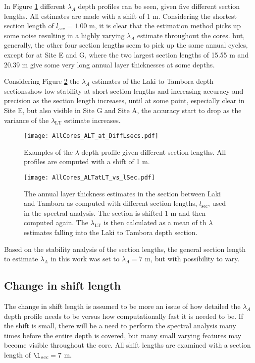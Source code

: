 \documentclass[../../CompleteThesis2/Complete_2ndDraft]{subfiles}
\begin{document}
In Figure \ref{Fig:AllCores_ALT_at_DiffLsecs} different $\lambda_A$ depth profiles can be seen, given five different section lengths. All estimates are made with a shift of 1 m. Considering the shortest section length of $l_{sec}=1.00$ m, it is clear that the estimation method picks up some noise resulting in a highly varying $\lambda_A$ estimate throughout the cores. but, generally, the other four section lengths seem to pick up the same annual cycles, except for at Site E and G, where the two largest section lengths of 15.55 m and 20.39 m give some very long annual layer thicknesses at some depths.

Considering Figure \ref{Fig:AllCores_ALTatLT_vs_lSec} the $\lambda_A$ estimates  of the Laki to Tambora depth sectionsshow low stability at short section lengths and increasing accuracy and precision as the section length increases, until at some point, especially clear in Site E, but also visible in Site G and Site A, the accuracy start to drop as the variance of the $\lambda_{\text{LT}}$ estimate increases.
\begin{figure}[h]
	\centering
	\texttt{[image: AllCores\_ALT\_at\_DiffLsecs.pdf]}
	\caption[$\lambda$ depth profiles, Different $l_{\text{sec}}$]{\small Examples of the $\lambda$ depth profile given different section lengths. All profiles are computed with a shift of 1 m.}
	\label{Fig:AllCores_ALT_at_DiffLsecs}
\end{figure}

\begin{figure}[h]
	\centering
	\texttt{[image: AllCores\_ALTatLT\_vs\_lSec.pdf]}
	\caption[$\lambda_{\text{LT}}$ vs. section length]{\small The annual layer thickness estimates in the section between Laki and Tambora as computed with different section lengths, $l_{\text{sec}}$, used in the spectral analysis. The section is shifted 1 m and then computed again. The $\lambda_{\text{LT}}$ is then calculated as a mean of th $\lambda$ estimates falling into the Laki to Tambora depth section.}
	\label{Fig:AllCores_ALTatLT_vs_lSec}
\end{figure}

Based on the stability analysis of the section lengths, the general section length to estimate $\lambda_A$ in this work was set to $\lambda_A=7$ m, but with possibility to vary.


\subsection[Change in $l_{shift}$]{Change in shift length}
\label{Subsec:SignalAnalysis_SpectralAnalysis_ALT_lshift}
The change in shift length is assumed to be more an issue of how detailed the $\lambda_A$ depth profile needs to be versus how computationally fast it is needed to be. If the shift is small, there will be a need to perform the spectral analysis many times before the entire depth is covered, but many small varying features may become visible throughout the core. All shift lengths are examined with a section length of $\l_{sec}=7$ m.
\end{document}
